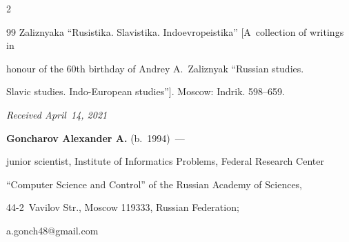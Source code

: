 \begin{multicols}{2}
{{\begin{thebibliography}{99}
{Zaliznyaka ``Rusistika. Slavistika. Indoevropeistika''} [A~collection of writings in 


honour of the 60th birthday of Andrey A.~Zaliznyak ``Russian studies. 


Slavic studies. Indo-European studies'']. Moscow: Indrik. 598--659.


{





}


\end{thebibliography}





 }


 }





\end{multicols}





\vspace*{-3pt}





  \hfill{\small\textit{Received April~14, 2021}}


















\Contr





\noindent


\textbf{Goncharov Alexander A.} (b.\ 1994)~---


junior scientist, Institute of Informatics Problems, Federal Research Center 


``Computer Science and Control'' of the Russian Academy of Sciences,  


44-2~Vavilov Str., Moscow 119333, Russian Federation; 


\mbox{a.gonch48@gmail.com}





\vspace*{3pt}





